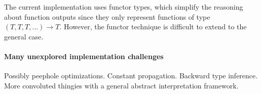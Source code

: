 \documentclass[pldi]{sigplanconf-pldi15}
\begin{document}
The current implementation uses functor types, which simplify the reasoning
about function outputs since they only represent functions of type $(T, T, T,
...) \rightarrow T$. However, the functor technique is difficult to extend to
the general case.

\paragraph{Many unexplored implementation challenges}
Possibly peephole optimizations. Constant propagation. Backward type inference.
More convoluted thingies with a general abstract interpretation framework.




\listoftodos %



\end{document}
